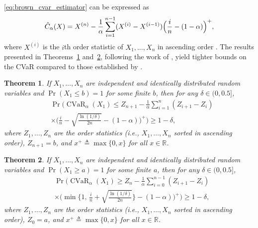 \documentclass[letterpaper]{article} %
\newtheorem{theorem}{Theorem}[section]
\begin{document}
\eqref{eq:brown_cvar_estimator} can be expressed as
\begin{equation}\label{eq:cvar_estimator_sorted_sample}
	\hat{C}_\alpha(X)=X^{(n)}-\frac{1}{\alpha}\sum_{i=1}^{n-1} (X^{(i)}-X^{(i-1)})\Bigl{(} \frac{i}{n}-(1-\alpha) \Bigr{)}^+,
\end{equation}
where $X^{(i)}$ is the $i$th order statistic of $X_1,\dots,X_n$ in ascending order \cite{pmlr-v97-thomas19a}. The results presented in Theorems~\ref{thm:thomas_upper_bound} and~\ref{thm:thomas_lower_bound}, following the work of \cite{pmlr-v97-thomas19a}, yield tighter bounds on the CVaR compared to those established by \cite{brown2007large}.
\begin{theorem}\label{thm:thomas_upper_bound}
	If $X_1, \ldots, X_n$ are independent and identically distributed random variables and $\Pr(X_1 \le b) = 1$ for some finite $b$, then for any $\delta \in (0, 0.5]$,
	\begin{equation}
		\begin{aligned}
			&\Pr\Bigg(
			\operatorname{CVaR}_\alpha(X_1)
			\le Z_{n+1}
			- \frac{1}{\alpha} \sum_{i=1}^n (Z_{i+1} - Z_i) \\
			&\times 
			\Bigg(
			\frac{i}{n} - \sqrt{\frac{\ln(1/\delta)}{2n}}
			- (1 - \alpha)\Bigg)^{+}
			\Bigg) \ge 1 - \delta,
		\end{aligned}
	\end{equation}
	where $Z_1, \ldots, Z_n$ are the order statistics (i.e., $X_1, \ldots, X_n$ sorted in ascending order), $Z_{n+1} = b$, and $x^+ \triangleq  \max\{0, x\}$ for all $x \in \mathbb{R}$.
\end{theorem}

\begin{theorem}\label{thm:thomas_lower_bound}
	If $X_1, \ldots, X_n$ are independent and identically distributed random variables and $\Pr(X_1 \ge a) = 1$ for some finite $a$, then for any $\delta \in (0, 0.5]$,
	\begin{equation}
		\begin{aligned}
			&\Pr\Bigg(
			\operatorname{CVaR}_\alpha(X_1)
			\ge Z_n
			- \frac{1}{\alpha} \sum_{i=0}^{n-1} (Z_{i+1} - Z_i) \\
			&\times \Big(
			\min \Big\{
			1,\, \frac{i}{n} + \sqrt{\frac{\ln(1/\delta)}{2n}}
			\Big\}
			- (1 - \alpha) \Big)^{+}
			\Bigg) \ge 1 - \delta,
		\end{aligned}
	\end{equation}
	where $Z_1, \ldots, Z_n$ are the order statistics (i.e., $X_1, \ldots, X_n$ sorted in ascending order), $Z_0 = a$, and $x^+ \triangleq \max\{0, x\}$ for all $x \in \mathbb{R}$.
\end{theorem}
\end{document}
